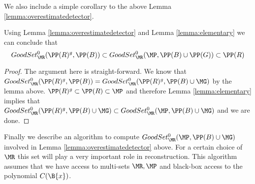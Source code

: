 We also include a simple corollary to the above Lemma \ref{lemma:overestimatedetector}.

\begin{corollary}
Using Lemma \ref{lemma:overestimatedetector} and Lemma \ref{lemma:elementary} we can conclude that
\begin{equation}
 GoodSet^0_{\MR}(\PP(R)^g, \PP(B)) \subset GoodSet^0_{\MR}(\MP,\PP(B)\cup\PP(G))\subset \PP(R) 
 \end{equation}

\end{corollary}

\begin{proof}
 The argument here is straight-forward. We know that $GoodSet^0_{\MR}(\PP(R)^g, \PP(B)) = 
 GoodSet^0_{\MR}(\PP(R)^g, \PP(B)\cup \MG)$ by the lemma above. $\PP(R)^g\subset \PP(R)\subset \MP$
 and therefore Lemma \ref{lemma:elementary} implies that $GoodSet^0_{\MR}(\PP(R)^g, \PP(B)\cup \MG)\subset
 GoodSet^0_{\MR}(\MP, \PP(B)\cup \MG)$ and we are done.   
\end{proof}



Finally we describe an algorithm to compute $GoodSet^0_{\MR}(\MP,\PP(B)\cup \MG)$ involved in Lemma \ref{lemma:overestimatedetector}
above. For a certain choice of $\MR$ this set will play a very important role in reconstruction.
This algorithm assumes that we have access to multi-sets $\MR, \MP$ and black-box access to the polynomial $C(\B{x})$.





